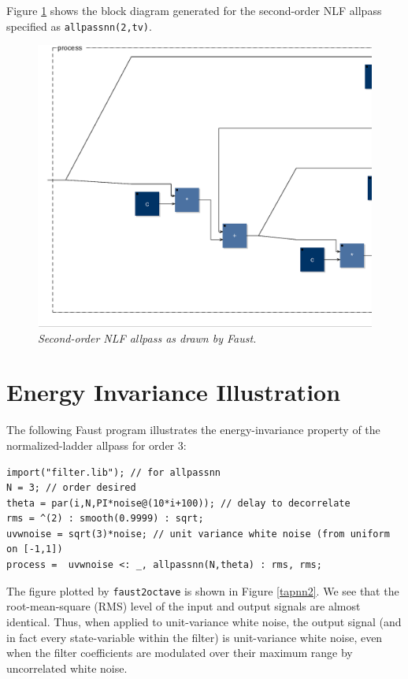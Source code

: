 \documentclass[twoside,a4paper]{article}
\begin{document}
Figure \ref{nlf2} shows the block diagram generated for the
second-order NLF allpass specified as \texttt{allpassnn(2,tv)}.

\begin{figure}[ht]
\center
\includegraphics[width=6.5in]{eps/nlf2.eps}
\caption{\label{nlf2}{\it Second-order NLF allpass as drawn by Faust.}}
\end{figure} 

\section{Energy Invariance Illustration}

The following Faust program illustrates the energy-invariance property
of the normalized-ladder allpass for order 3:
\begin{verbatim}
import("filter.lib"); // for allpassnn
N = 3; // order desired
theta = par(i,N,PI*noise@(10*i+100)); // delay to decorrelate
rms = ^(2) : smooth(0.9999) : sqrt;
uvwnoise = sqrt(3)*noise; // unit variance white noise (from uniform on [-1,1])
process =  uvwnoise <: _, allpassnn(N,theta) : rms, rms;
\end{verbatim}
The figure plotted by \texttt{faust2octave} is shown in Figure
\ref{tapnn2}.  We see that the root-mean-square (RMS) level of the
input and output signals are almost identical.  Thus, when applied to
unit-variance white noise, the output signal (and in fact every
state-variable within the filter) is unit-variance white noise, even
when the filter coefficients are modulated over their maximum range by
uncorrelated white noise.
\end{document}
